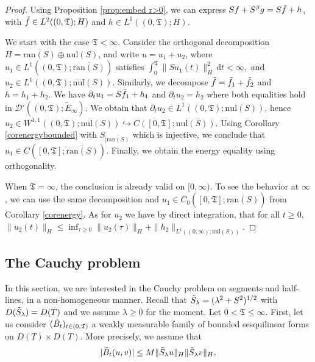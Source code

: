 \documentclass[11pt, letterpaper]{amsart}
\theoremstyle{definition}
\theoremstyle{remark}
\numberwithin{equation}{section}
\begin{document}
\begin{proof}
Using Proposition \ref{prop:embed r>0}, we can express $S f + S^\beta g = S \Tilde{f} + h$, with $\Tilde{f} \in L^2((0, \mathfrak{T}); H)$ and $h \in L^1((0, \mathfrak{T}); H)$.

We start with the case $\mathfrak{T} < \infty$. Consider the orthogonal decomposition $H = \overline{\mathrm{ran}(S)} \oplus \mathrm{nul}(S)$, and write $u = u_1 + u_2$, where $u_1 \in L^1((0, \mathfrak{T}); \overline{\mathrm{ran}(S)})$ satisfies $\int_0^{\mathfrak{T}} \| S u_1(t) \|_H^2 \, \mathrm{d}t < \infty,$
and $u_2 \in L^1((0, \mathfrak{T}); \mathrm{nul}(S))$. Similarly, we decompose $\Tilde{f} = \Tilde{f}_1 + \Tilde{f}_2$ and $h = h_1 + h_2$. We have $\partial_t u_1 = S \Tilde{f}_1 + h_1$ and $ \partial_t u_2 = h_2$ where both equalities hold in $ \mathcal{D}'((0, \mathfrak{T}); \tilde{E}_{\infty})$. We obtain that $\partial_t u_2 \in L^1((0, \mathfrak{T}); \mathrm{nul}(S))$, hence $u_2 \in W^{1,1}((0, \mathfrak{T}); \mathrm{nul}(S)) \hookrightarrow C([0, \mathfrak{T}]; \mathrm{nul}(S))$. Using Corollary \ref{corenergybounded} with $S_{\vert \overline{\mathrm{ran}(S)}}$ which is injective, we conclude that $u_1 \in C([0, \mathfrak{T}]; \overline{\mathrm{ran}(S)})$. Finally, we obtain the energy equality using orthogonality.

When $\mathfrak{T} = \infty$, the conclusion  is already valid on $[0,\infty)$.  To see the behavior at $\infty$, we can use the same decomposition and $u_{1}\in C_{0}([0, \mathfrak{T}]; \overline{\mathrm{ran}(S)})$ from Corollary \ref{corenergy}. As for $u_{2}$ we have by direct integration, that for all $t\ge 0$, $\|u_{2}(t)\|_{H} \le \inf_{\tau\ge 0}\|u_{2}(\tau)\|_{H}+ \| h_{2} \|_{L^1((0, \infty); \mathrm{nul}(S))}$.
\end{proof}




\subsection{The Cauchy problem}\label{sec:inhomogenousCP}
In this section, we are interested in the Cauchy problem on  segments and half-lines, in a non-homogeneous manner. Recall that $\Tilde{S}_\lambda=(\lambda^2+S^2)^{{1}/{2}}$ with $D(\Tilde{S}_\lambda)=D({T})$ and we assume $\lambda\ge 0$ for the moment. Let  $0<\mathfrak{T}\le \infty$. First, let us consider $(\Tilde{B}_t)_{t \in (0,\mathfrak{T})}$ a weakly measurable family of bounded sesquilinear forms on $D({T})\times D({T})$. More precisely, we assume that 
\begin{equation}\label{eq:unifbdd}
     |\Tilde{B}_t(u,v) |\leq  M \| \Tilde{S}_\lambda u \|_H \| \Tilde{S}_\lambda v\|_H,
\end{equation}
\end{document}
